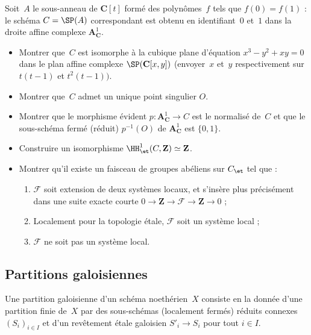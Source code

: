 \documentclass[10pt]{../fichiers-configuration-latex/smfart}
\begin{document}
\begin{exercice2}
Soit $A$ le sous-anneau de $\mathbf{C}[t]$ formé des
polynômes $f$ tels que $f(0)=f(1)$ : le schéma $C=\SP(A)$ correspondant
est obtenu en identifiant $0$ et $1$ dans la droite affine complexe
$\mathbf{A}^1_{\mathbf{C}}$.

\begin{itemize}
\item Montrer que $C$ est isomorphe à la cubique plane d'équation $x^3-y^2+xy=0$
dans le plan affine complexe $\SP(\mathbf{C}[x,y])$
(envoyer $x$ et $y$ respectivement sur $t(t-1)$ et $t^2(t-1))$.

\item Montrer que $C$ admet un unique point singulier $O$.

\item Montrer que le morphisme évident $p\colon
\mathbf{A}^1_{\mathbf{C}}\to C$ est le normalisé de $C$ et que le
sous-schéma fermé (réduit) $p^{-1}(O)$ de $\mathbf{A}^1_{\mathbf{C}}$
est $\{0,1\}$.

\item Construire un isomorphisme $\HH^1_\et(C,\mathbf{Z})\simeq \mathbf{Z}$.

\item Montrer qu'il existe un faisceau de groupes abéliens sur
$C_\et$ tel que :
\begin{enumerate}
\item[(i)] $\mathscr F$ soit extension de deux systèmes locaux, et s'insère
plus précisément dans une suite exacte courte 
$0\to\mathbf{Z}\to\mathscr F\to\mathbf{Z}\to 0$ ;
\item[(i')] Localement pour la topologie étale, $\mathscr F$ soit un système
local ;
\item[(ii)] $\mathscr F$ ne soit pas un système local.
\end{enumerate}
\end{itemize}
\end{exercice2}

\subsection{Partitions galoisiennes}%

\begin{definition2}
Une partition galoisienne d'un schéma noethérien $X$ consiste en la donnée
d'une partition finie de $X$ par des sous-schémas (localement fermés)
réduits connexes $(S_i)_{i\in I}$ et d'un revêtement étale galoisien
$S'_i\to S_i$ pour tout $i\in I$.
\end{definition2}
\end{document}
